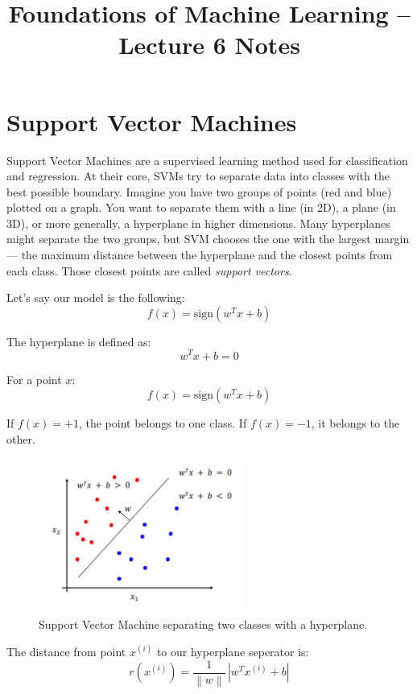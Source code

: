 \documentclass[11pt]{article}
\title{Foundations of Machine Learning -- Lecture 6 Notes}
\author{}
\date{}
\begin{document}
\maketitle

\section*{Support Vector Machines}
Support Vector Machines are a supervised learning method used for classification and regression. 
At their core, SVMs try to separate data into classes with the best possible boundary. 
Imagine you have two groups of points (red and blue) plotted on a graph. 
You want to separate them with a line (in 2D), a plane (in 3D), or more generally, a hyperplane in higher dimensions. 
Many hyperplanes might separate the two groups, but SVM chooses the one with the largest margin — the maximum distance between the hyperplane and the closest points from each class. 
Those closest points are called \textit{support vectors}.

\medskip

Let’s say our model is the following:
\[
f(x) = \text{sign}(w^T x + b)
\]

The hyperplane is defined as:
\[
w^T x + b = 0
\]

For a point $x$:
\[
f(x) = \text{sign}(w^T x + b)
\]

If $f(x) = +1$, the point belongs to one class.  
If $f(x) = -1$, it belongs to the other.

\begin{figure}[h!]
\centering
\includegraphics[width=0.6\textwidth]{../imgs/svm.png}
\caption{Support Vector Machine separating two classes with a hyperplane.}
\end{figure}

\pagebreak
The distance from point $x^(i)$ to our hyperplane seperator is:
\[
r(x^{(i)}) = \frac{1}{\left\lVert w \right\rVert} \, \left| w^T x^{(i)} + b \right|
\]
\end{document}
